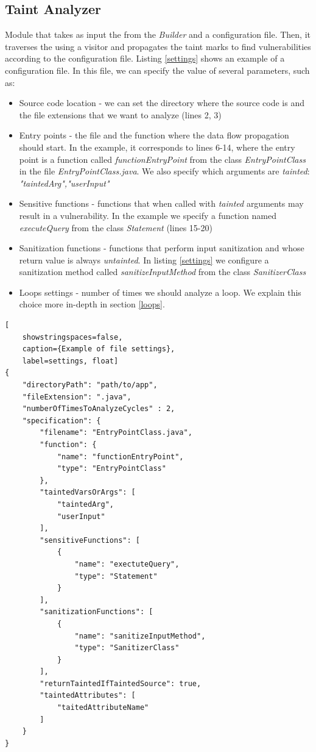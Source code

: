 \subsection{Taint Analyzer} 
Module that takes as input the \astname{} from the \textit{\astname{} Builder} and a configuration file. Then, it traverses the \astname{} using a visitor and propagates the taint marks to find vulnerabilities according to the configuration file. 
Listing \ref{settings} shows an example of a configuration file. In this file, we can specify the value of several parameters, such as:
\begin{itemize}
    \item Source code location - we can set the directory where the source code is and the file extensions that we want to analyze (lines 2, 3)
    \item Entry points - the file and the function where the data flow propagation should start. In the example, it corresponds to lines 6-14, where the entry point is a function called \textit{functionEntryPoint} from the class \textit{EntryPointClass} in the file \textit{EntryPointClass.java}. We also specify which arguments are \textit{tainted}: \textit{"taintedArg","userInput"}
    \item Sensitive functions - functions that when called with \textit{tainted} arguments may result in a vulnerability. In the example we specify a function named \textit{executeQuery} from the class \textit{Statement} (lines 15-20)
    \item Sanitization functions - functions that perform input sanitization and whose return value is always \textit{untainted}. In listing \ref{settings} we configure a sanitization method called \textit{sanitizeInputMethod} from the class \textit{SanitizerClass}
    \item Loops settings - number of times we should analyze a loop. We explain this choice more in-depth in section \ref{loops}.
\end{itemize}


\begin{lstlisting}[
    showstringspaces=false,
    caption={Example of file settings},
    label=settings, float]
{
    "directoryPath": "path/to/app",
    "fileExtension": ".java",
    "numberOfTimesToAnalyzeCycles" : 2,
    "specification": {
        "filename": "EntryPointClass.java",
        "function": {
            "name": "functionEntryPoint",
            "type": "EntryPointClass"
        },
        "taintedVarsOrArgs": [
            "taintedArg",
            "userInput"
        ],
        "sensitiveFunctions": [
            {
                "name": "exectuteQuery",
                "type": "Statement"
            }
        ],
        "sanitizationFunctions": [
            {
                "name": "sanitizeInputMethod",
                "type": "SanitizerClass"
            }
        ],
        "returnTaintedIfTaintedSource": true,
        "taintedAttributes": [
            "taitedAttributeName"
        ]
    }
}
\end{lstlisting}


